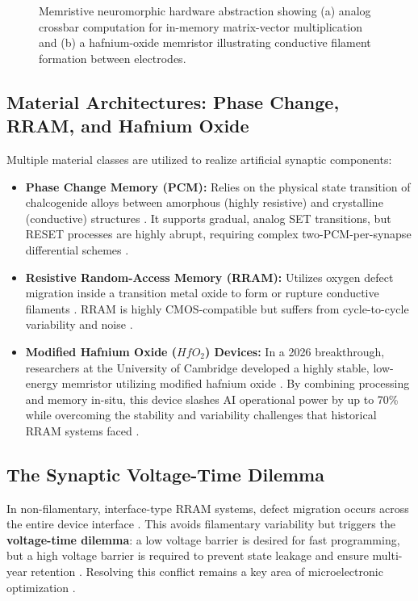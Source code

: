 \documentclass[11pt]{article}
\begin{document}
\begin{figure}[htbp]
{\begin{minipage}{0.48\textwidth}

\end{minipage}%
}

\caption{
Memristive neuromorphic hardware abstraction showing
(a) analog crossbar computation for in-memory matrix-vector multiplication and
(b) a hafnium-oxide memristor illustrating conductive filament formation between electrodes.
}

\label{fig:memristor_crossbar}

\end{figure}

\subsection{Material Architectures: Phase Change, RRAM, and Hafnium Oxide}
Multiple material classes are utilized to realize artificial synaptic components:
\begin{itemize}
    \item \textbf{Phase Change Memory (PCM):} Relies on the physical state transition of chalcogenide alloys between amorphous (highly resistive) and crystalline (conductive) structures \cite{schuman2017survey}. It supports gradual, analog SET transitions, but RESET processes are highly abrupt, requiring complex two-PCM-per-synapse differential schemes \cite{schuman2017survey}.
    \item \textbf{Resistive Random-Access Memory (RRAM):} Utilizes oxygen defect migration inside a transition metal oxide to form or rupture conductive filaments \cite{schuman2017survey}. RRAM is highly CMOS-compatible but suffers from cycle-to-cycle variability and noise \cite{schuman2017survey}.
    \item \textbf{Modified Hafnium Oxide ($HfO_2$) Devices:} In a 2026 breakthrough, researchers at the University of Cambridge developed a highly stable, low-energy memristor utilizing modified hafnium oxide \cite{burr2017nvm}. By combining processing and memory in-situ, this device slashes AI operational power by up to 70\% while overcoming the stability and variability challenges that historical RRAM systems faced \cite{burr2017nvm}.
\end{itemize}

\subsection{The Synaptic Voltage-Time Dilemma}
In non-filamentary, interface-type RRAM systems, defect migration occurs across the entire device interface \cite{schuman2017survey}. This avoids filamentary variability but triggers the \textbf{voltage-time dilemma}: a low voltage barrier is desired for fast programming, but a high voltage barrier is required to prevent state leakage and ensure multi-year retention \cite{schuman2017survey}. Resolving this conflict remains a key area of microelectronic optimization \cite{schuman2017survey}.
\end{document}
